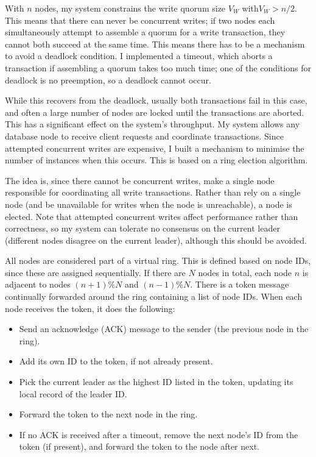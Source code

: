 \documentclass[12pt,a4paper,twoside,openright]{report}
\begin{document}
With $n$ nodes, my system constrains the write quorum size $V_W$ with$V_W > n / 2$. This means that there can never be concurrent writes; if two nodes each simultaneously attempt to assemble a quorum for a write transaction, they cannot both succeed at the same time. This means there has to be a mechanism to avoid a deadlock condition. I implemented a timeout, which aborts a transaction if assembling a quorum takes too much time; one of the conditions for deadlock is no preemption, so a deadlock cannot occur.

While this recovers from the deadlock, usually both transactions fail in this case, and often a large number of nodes are locked until the transactions are aborted. This has a significant effect on the system's throughput. My system allows any database node to receive client requests and coordinate transactions. Since attempted concurrent writes are expensive, I built a mechanism to minimise the number of instances when this occurs. This is based on a ring election algorithm.

The idea is, since there cannot be concurrent writes, make a single node responsible for coordinating all write transactions. Rather than rely on a single node (and be unavailable for writes when the node is unreachable), a node is elected. Note that attempted concurrent writes affect performance rather than correctness, so my system can tolerate no consensus on the current leader (different nodes disagree on the current leader), although this should be avoided.

All nodes are considered part of a virtual ring. This is defined based on node IDs, since these are assigned sequentially. If there are $N$ nodes in total, each node $n$ is adjacent to nodes $(n + 1) \% N$ and $(n - 1) \% N$. There is a token message continually forwarded around the ring containing a list of node IDs. When each node receives the token, it does the following:

\begin{itemize}
\item
Send an acknowledge (ACK) message to the sender (the previous node in the ring).

\item
Add its own ID to the token, if not already present.

\item
Pick the current leader as the highest ID listed in the token, updating its local record of the leader ID.

\item
Forward the token to the next node in the ring.

\item
If no ACK is received after a timeout, remove the next node's ID from the token (if present), and forward the token to the node after next.

\end{itemize}
\end{document}
